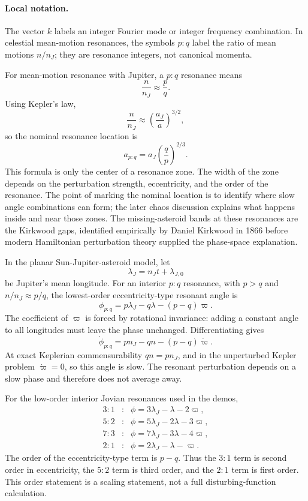 \paragraph{Local notation.}
The vector \(k\) labels an integer Fourier mode or integer frequency
combination.  In celestial mean-motion resonances, the symbols \(p:q\) label
the ratio of mean motions \(n/n_J\); they are resonance integers, not canonical
momenta.

For mean-motion resonance with Jupiter, a \(p:q\) resonance means
\[
  \frac{n}{n_J}\approx \frac{p}{q}.
\]
Using Kepler's law,
\[
  \frac{n}{n_J}\approx
  \left(\frac{a_J}{a}\right)^{3/2},
\]
so the nominal resonance location is
\[
  \boxed{
  a_{p:q}=a_J\left(\frac{q}{p}\right)^{2/3}
  }.
\]
This formula is only the center of a resonance zone. The width of the zone
depends on the perturbation strength, eccentricity, and the order of the
resonance. The point of marking the nominal location is to identify where slow
angle combinations can form; the later chaos discussion explains what happens
inside and near those zones.
The missing-asteroid bands at these resonances are the Kirkwood gaps,
identified empirically by Daniel Kirkwood in 1866 before modern Hamiltonian
perturbation theory supplied the phase-space explanation.

In the planar Sun-Jupiter-asteroid model, let
\[
  \lambda_J=n_Jt+\lambda_{J,0}
\]
be Jupiter's mean longitude.  For an interior \(p:q\) resonance, with
\(p>q\) and \(n/n_J\approx p/q\), the lowest-order eccentricity-type resonant
angle is
\[
  \boxed{
  \phi_{p:q}
  =
  p\lambda_J-q\lambda-(p-q)\varpi .
  }
\]
The coefficient of \(\varpi\) is forced by rotational invariance: adding a
constant angle to all longitudes must leave the phase unchanged.  Differentiating
gives
\[
  \dot\phi_{p:q}
  =
  pn_J-qn-(p-q)\dot\varpi .
 \]
At exact Keplerian commensurability \(qn=pn_J\), and in the unperturbed Kepler
problem \(\dot\varpi=0\), so this angle is slow.  The resonant perturbation
depends on a slow phase and therefore does not average away.

For the low-order interior Jovian resonances used in the demos,
\[
\begin{array}{ccl}
3:1 &:& \phi=3\lambda_J-\lambda-2\varpi,\\
5:2 &:& \phi=5\lambda_J-2\lambda-3\varpi,\\
7:3 &:& \phi=7\lambda_J-3\lambda-4\varpi,\\
2:1 &:& \phi=2\lambda_J-\lambda-\varpi .
\end{array}
\]
The order of the eccentricity-type term is \(p-q\).  Thus the \(3:1\) term is
second order in eccentricity, the \(5:2\) term is third order, and the \(2:1\)
term is first order.  This order statement is a scaling statement, not a full
disturbing-function calculation.


